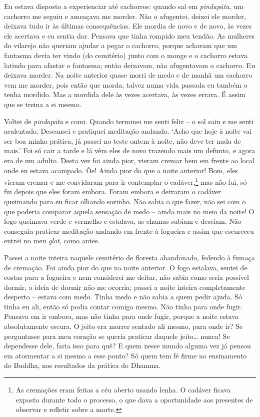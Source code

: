 Eu estava disposto a experienciar até cachorros: quando saí em
\emph{pindapāta}, um cachorro me seguiu e ameaçava me morder. Não o
afugentei, deixei ele morder, deixava tudo ir às últimas consequências.
Ele mordia de novo e de novo, às vezes ele acertava e eu sentia dor.
Pensava que tinha rompido meu tendão. As mulheres do vilarejo não
queriam ajudar a pegar o cachorro, porque achavam que um fantasma devia
ter vindo (do cemitério) junto com o monge e o cachorro estava latindo
para afastar o fantasma; então deixavam, não afugentavam o cachorro. Eu
deixava morder. Na noite anterior quase morri de medo e de manhã um
cachorro vem me morder, pois então que morda, talvez numa vida passada
eu também o tenha mordido. Mas a mordida dele às vezes acertava, às
vezes errava. É assim que se treina a si mesmo.

Voltei de \emph{pindapāta} e comi. Quando terminei me senti feliz -- o
sol saiu e me senti acalentado. Descansei e pratiquei meditação andando.
`Acho que hoje à noite vai ser boa minha prática, já passei no teste
ontem à noite, não deve ter nada de mais.' Foi só cair a tarde e lá vêm
eles de novo trazendo mais um defunto, e agora era de um adulto. Desta
vez foi ainda pior, vieram cremar bem em frente ao local onde eu estava
acampado. Ôe! Ainda pior do que a noite anterior! Bom, eles vieram
cremar e me convidaram para ir contemplar o cadáver,\footnote{As
  cremações eram feitas a céu aberto usando lenha. O cadáver ficava
  exposto durante todo o processo, o que dava a oportunidade aos
  presentes de observar e refletir sobre a morte.} mas não fui, só fui
depois que eles foram embora. Foram embora e deixaram o cadáver
queimando para eu ficar olhando sozinho. Não sabia o que fazer, não sei
com o que poderia comparar aquela sensação de medo -- ainda mais no meio
da noite! O fogo queimava verde e vermelho e estalava, as chamas subiam
e desciam. Não conseguia praticar meditação andando em frente à fogueira
e assim que escureceu entrei no meu \emph{glot}, como antes.

Passei a noite inteira naquele cemitério de floresta abandonado, fedendo
à fumaça de cremação. Foi ainda pior do que na noite anterior. O fogo
estalava, sentei de costas para a fogueira e nem considerei me deitar,
não sabia como seria possível dormir, a ideia de dormir não me ocorria;
passei a noite inteira completamente desperto -- estava com medo. Tinha
medo e não sabia a quem pedir ajuda. Só tinha eu ali, então só podia
contar comigo mesmo. Não tinha para onde fugir. Pensava em ir embora,
mas não tinha para onde fugir, porque a noite estava absolutamente
escura. O jeito era morrer sentado ali mesmo, para onde ir? Se
perguntasse para meu coração se queria praticar daquele jeito\ldots{}
nunca! Se dependesse dele, faria isso para quê? E quem nesse mundo
alguma vez já pensou em atormentar a si mesmo a esse ponto? Só quem tem
fé firme no ensinamento do Buddha, nos resultados da prática do Dhamma.

